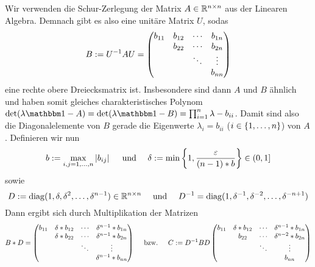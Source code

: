 \begin{exercisePage}
	Wir verwenden die Schur-Zerlegung der Matrix $A \in \mathbb{R}^{n \times n}$ aus der Linearen Algebra. Demnach gibt es also eine unitäre Matrix $U$, sodas
	\begin{equation*}
		B \mathrel{:=} U^{-1} A U = 
		\begin{pmatrix}
			b_{11} & b_{12} & \cdots & b_{1n} \\
			       & b_{22} & \cdots & b_{2n} \\
			       &        & \ddots & \vdots \\
			       &		&    	 & b_{nn}
		\end{pmatrix}	
	\end{equation*}
	eine rechte obere Dreiecksmatrix ist. Insbesondere sind dann $A$ und $B$ ähnlich und haben somit gleiches charakteristisches Polynom $\det(\lambda \one - A) = \det(\lambda \one - B) = \prod_{i=1}^n \lambda - b_{ii}$. Damit sind also die Diagonalelemente von $B$ gerade die Eigenwerte $\lambda_i = b_{ii}$ ($i \in \left\{ 1, \dots , n \right\}$) von $A$. Definieren wir nun 
	\begin{equation*}
		b \mathrel{:=} \max_{i,j = 1,\dots , n} \left| b_{ij} \right| 
		\quad \text{ und } \quad 
		\delta \mathrel{:=} \min\left\{ 1,\frac{\varepsilon}{(n-1)*b} \right\} \in (0,1]
	\end{equation*}
	sowie
	\begin{equation*}
		D \mathrel{:=} \operatorname{diag}(1 , \delta , \delta^2, \dots , \delta^{n-1}) \in \mathbb{R}^{n \times n}
		\quad \text{ und } \quad
		D^{-1} = \operatorname{diag}(1 , \delta^{-1} , \delta^{-2}, \dots , \delta^{-n+1})
	\end{equation*}
	Dann ergibt sich durch Multiplikation der Matrizen
	\begin{equation*}
		B*D = 
		\begin{pmatrix}
		b_{11} & \delta * b_{12} & \cdots & \delta^{n-1} * b_{1n} \\
		       & \delta * b_{22} & \cdots & \delta^{n-1} * b_{2n} \\
		       &                 & \ddots & \vdots \\
		       &		         &    	  & \delta^{n-1} * b_{nn}
		\end{pmatrix} 
		\quad \text{ bzw. } \quad
		C \mathrel{:=} D^{-1} B D
		\begin{pmatrix}
		b_{11} & \delta * b_{12} & \cdots & \delta^{n-1} * b_{1n} \\
			   &          b_{22} & \cdots & \delta^{n-2} * b_{2n} \\
			   &                 & \ddots & \vdots \\
			   &		         &    	  &                b_{nn}

\end{pmatrix}
\end{equation*}
\end{exercisePage}
